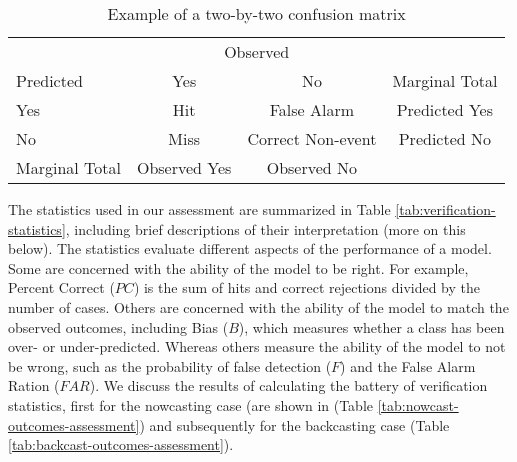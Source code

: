 \documentclass[]{elsarticle} %
\begin{document}
\begin{table}[!h]

\caption{\label{tab:example-confusion-matrix}\label{tab:confusion-matrix}Example of a two-by-two confusion matrix}
\centering
\fontsize{7}{9}\selectfont
\begin{tabular}[t]{lccc}
\toprule
\multicolumn{1}{c}{ } & \multicolumn{2}{c}{Observed} & \multicolumn{1}{c}{ } \\
\cmidrule(l{3pt}r{3pt}){2-3}
Predicted & Yes & No & Marginal Total\\
\midrule
\rowcolor{gray!6}  Yes & Hit & False Alarm & Predicted Yes\\
No & Miss & Correct Non-event & Predicted No\\
\rowcolor{gray!6}  Marginal Total & Observed Yes & Observed No & \\
\bottomrule
\end{tabular}
\end{table}

The statistics used in our assessment are summarized in Table
\ref{tab:verification-statistics}, including brief descriptions of their
interpretation (more on this below). The statistics evaluate different
aspects of the performance of a model. Some are concerned with the
ability of the model to be right. For example, Percent Correct (\(PC\))
is the sum of hits and correct rejections divided by the number of
cases. Others are concerned with the ability of the model to match the
observed outcomes, including Bias (\(B\)), which measures whether a
class has been over- or under-predicted. Whereas others measure the
ability of the model to not be wrong, such as the probability of false
detection (\(F\)) and the False Alarm Ration (\(FAR\)). We discuss the
results of calculating the battery of verification statistics, first for
the nowcasting case (are shown in (Table
\ref{tab:nowcast-outcomes-assessment}) and subsequently for the
backcasting case (Table \ref{tab:backcast-outcomes-assessment}).
\end{document}
